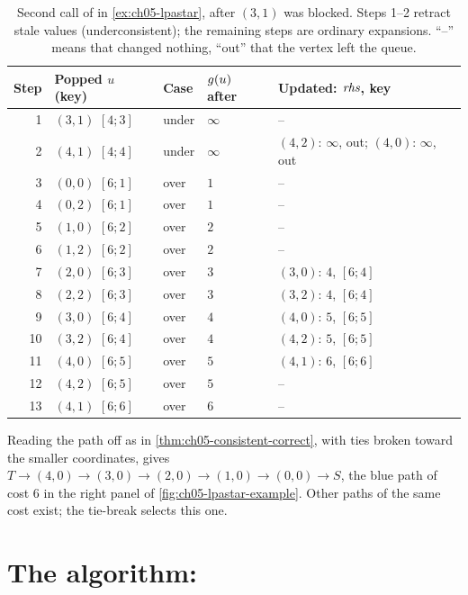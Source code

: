 \begin{table}[tb]
  \centering\footnotesize
  \caption{Second call of \protect\LpaComputeShortestPath in \cref{ex:ch05-lpastar}, after
  $(3,1)$ was blocked. Steps 1--2 retract stale values (underconsistent); the remaining
  steps are ordinary expansions. ``--'' means that \protect\LpaUpdateVertex changed nothing,
  ``out'' that the vertex left the queue.}
  \label{tab:ch05-lpastar-repair}
  \begin{tabular}{@{}rlllL{6.8cm}@{}}
  \toprule
  Step & Popped $u$ (key) & Case & $g(u)$ after & Updated: $\mathit{rhs}$, key\\
   & $(3,1)$ $[4;3]$ & under & $\infty$ & --\\
  2 & $(4,1)$ $[4;4]$ & under & $\infty$ & $(4,2)$: $\infty$, out; $(4,0)$: $\infty$, out\\
  3 & $(0,0)$ $[6;1]$ & over & $1$ & --\\
  4 & $(0,2)$ $[6;1]$ & over & $1$ & --\\
  5 & $(1,0)$ $[6;2]$ & over & $2$ & --\\
  6 & $(1,2)$ $[6;2]$ & over & $2$ & --\\
  7 & $(2,0)$ $[6;3]$ & over & $3$ & $(3,0)$: $4$, $[6;4]$\\
  8 & $(2,2)$ $[6;3]$ & over & $3$ & $(3,2)$: $4$, $[6;4]$\\
  9 & $(3,0)$ $[6;4]$ & over & $4$ & $(4,0)$: $5$, $[6;5]$\\
  10 & $(3,2)$ $[6;4]$ & over & $4$ & $(4,2)$: $5$, $[6;5]$\\
  11 & $(4,0)$ $[6;5]$ & over & $5$ & $(4,1)$: $6$, $[6;6]$\\
  12 & $(4,2)$ $[6;5]$ & over & $5$ & --\\
  13 & $(4,1)$ $[6;6]$ & over & $6$ & --\\
  \bottomrule
  \end{tabular}
\end{table}

Reading the path off as in \cref{thm:ch05-consistent-correct}, with ties broken toward
the smaller coordinates, gives $T \to (4,0) \to (3,0) \to (2,0) \to (1,0) \to (0,0) \to S$,
the blue path of cost $6$ in the right panel of \cref{fig:ch05-lpastar-example}. Other
paths of the same cost exist; the tie-break selects this one.

\FloatBarrier
\section{The algorithm: \dstarlite}
\label{sec:ch05-dstarlite}

